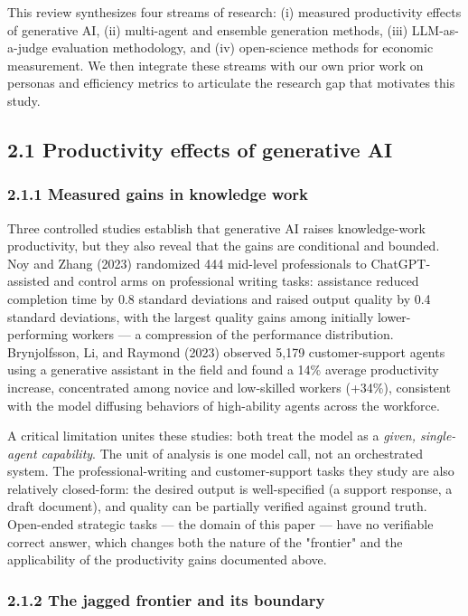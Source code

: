 \documentclass[11pt,a4paper]{article}
\begin{document}
This review synthesizes four streams of research: (i) measured productivity
effects of generative AI, (ii) multi-agent and ensemble generation methods,
(iii) LLM-as-a-judge evaluation methodology, and (iv) open-science methods
for economic measurement. We then integrate these streams with our own prior
work on personas and efficiency metrics to articulate the research gap that
motivates this study.

\subsection{2.1 Productivity effects of generative AI}

\subsubsection{2.1.1 Measured gains in knowledge work}

Three controlled studies establish that generative AI raises knowledge-work
productivity, but they also reveal that the gains are conditional and
bounded. Noy and Zhang (2023) randomized 444 mid-level professionals to
ChatGPT-assisted and control arms on professional writing tasks: assistance
reduced completion time by 0.8 standard deviations and raised output quality
by 0.4 standard deviations, with the largest quality gains among initially
lower-performing workers — a compression of the performance distribution.
Brynjolfsson, Li, and Raymond (2023) observed 5,179 customer-support agents
using a generative assistant in the field and found a 14\% average
productivity increase, concentrated among novice and low-skilled workers
(+34\%), consistent with the model diffusing behaviors of high-ability agents
across the workforce.

A critical limitation unites these studies: both treat the model as a
\textit{given, single-agent capability}. The unit of analysis is one model call,
not an orchestrated system. The professional-writing and customer-support
tasks they study are also relatively closed-form: the desired output is
well-specified (a support response, a draft document), and quality can be
partially verified against ground truth. Open-ended strategic tasks — the
domain of this paper — have no verifiable correct answer, which changes both
the nature of the "frontier" and the applicability of the productivity
gains documented above.

\subsubsection{2.1.2 The jagged frontier and its boundary}
\end{document}
